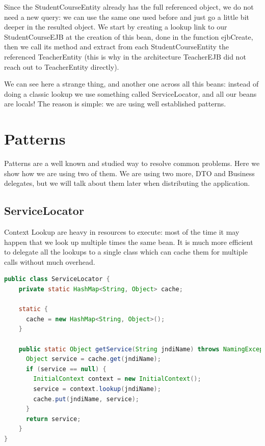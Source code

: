 \documentclass[12pt, a4paper]{article}
\begin{document}
  Since the StudentCourseEntity already has the full referenced object, we do not need a new query: we can use the same one used before and just go a little bit deeper in the resulted object. We start by creating a lookup link to our StudentCourseEJB at the creation of this bean, done in the function ejbCreate, then we call its method and extract from each StudentCourseEntity the referenced TeacherEntity (this is why in the architecture TeacherEJB did not reach out to TeacherEntity directly).

  We can see here a strange thing, and another one across all this beans: instead of doing a classic lookup we use something called ServiceLocator, and all our beans are locals! The reason is simple: we are using well established patterns.

  \pagebreak
  \section{Patterns}
  Patterns are a well known and studied way to resolve common problems. Here we show how we are using two of them. We are using two more, DTO and Business delegates, but we will talk about them later when distributing the application.
  
  \subsection{ServiceLocator}
  Context Lookup are heavy in resources to execute: most of the time it may happen that we look up multiple times the same bean. It is much more efficient to delegate all the lookups to a single class which can cache them for multiple calls without much overhead.
  \begin{lstlisting}[language=java, caption={ServiceLocator}]
    public class ServiceLocator {
    private static HashMap<String, Object> cache;

    static {
      cache = new HashMap<String, Object>();
    }

    public static Object getService(String jndiName) throws NamingException {
      Object service = cache.get(jndiName);
      if (service == null) {
        InitialContext context = new InitialContext();
        service = context.lookup(jndiName);
        cache.put(jndiName, service);
      }
      return service;
    }
}
  \end{lstlisting}
  
  \pagebreak
\end{document}
